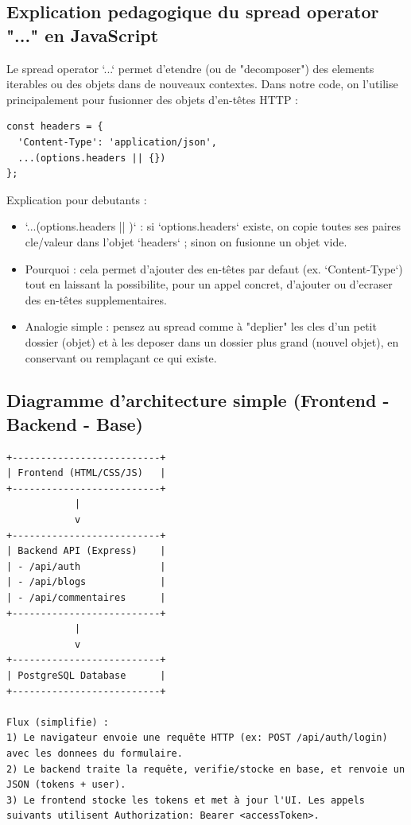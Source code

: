 \documentclass[a4paper,12pt]{book}
\begin{document}
\subsection{Explication pedagogique du spread operator "..." en JavaScript}
Le spread operator `...` permet d'etendre (ou de "decomposer") des elements
iterables ou des objets dans de nouveaux contextes. Dans notre code, on l'utilise
principalement pour fusionner des objets d'en-têtes HTTP :
\begin{lstlisting}[style=javascript,caption=Exemple d'utilisation du spread operator]
const headers = {
  'Content-Type': 'application/json',
  ...(options.headers || {})
};
\end{lstlisting}

Explication pour debutants :
\begin{itemize}
    \item `...(options.headers || {})` : si `options.headers` existe, on copie
    toutes ses paires cle/valeur dans l'objet `headers` ; sinon on fusionne un
    objet vide.
    \item Pourquoi : cela permet d'ajouter des en-têtes par defaut (ex. `Content-Type`) tout en laissant la possibilite, pour un appel concret, d'ajouter ou d'ecraser des en-têtes supplementaires.
    \item Analogie simple : pensez au spread comme à "deplier" les cles d'un petit dossier (objet) et à les deposer dans un dossier plus grand (nouvel objet), en conservant ou remplaçant ce qui existe.
\end{itemize}

\subsection{Diagramme d'architecture simple (Frontend - Backend - Base)}
\begin{verbatim}
+--------------------------+
| Frontend (HTML/CSS/JS)   |
+--------------------------+
            |
            v
+--------------------------+
| Backend API (Express)    |
| - /api/auth              |
| - /api/blogs             |
| - /api/commentaires      |
+--------------------------+
            |
            v
+--------------------------+
| PostgreSQL Database      |
+--------------------------+

Flux (simplifie) :
1) Le navigateur envoie une requête HTTP (ex: POST /api/auth/login) avec les donnees du formulaire.
2) Le backend traite la requête, verifie/stocke en base, et renvoie un JSON (tokens + user).
3) Le frontend stocke les tokens et met à jour l'UI. Les appels suivants utilisent Authorization: Bearer <accessToken>.
\end{verbatim}
\end{document}
